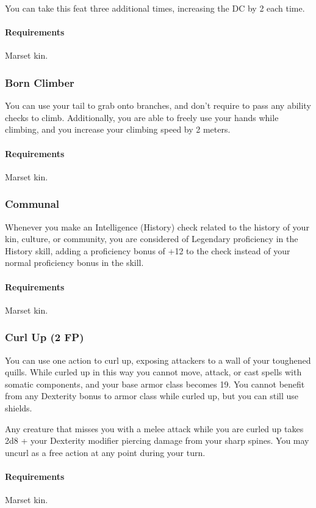         You can take this feat three additional times, increasing the DC by 2 each time.
        \paragraph{Requirements} Marset kin.
    \subsubsection{Born Climber} \label{feat::bornclimber}
        You can use your tail to grab onto branches, and don't require to pass any ability checks to climb.
        Additionally, you are able to freely use your hands while climbing, and you increase your climbing speed by 2 meters.
        \paragraph{Requirements} Marset kin.
    \subsubsection{Communal} \label{feat::communal}
        Whenever you make an Intelligence (History) check related to the history of your kin, culture, or community, you are considered of Legendary proficiency in the History skill, adding a proficiency bonus of +12 to the check instead of your normal proficiency bonus in the skill.
        \paragraph{Requirements} Marset kin.
    \subsubsection{Curl Up (2 FP)} \label{feat::curlup}
        You can use one action to curl up, exposing attackers to a wall of your toughened quills.
        While curled up in this way you cannot move, attack, or cast spells with somatic components, and your base armor class becomes 19.
        You cannot benefit from any Dexterity bonus to armor class while curled up, but you can still use shields.

        Any creature that misses you with a melee attack while you are curled up takes 2d8 + your Dexterity modifier piercing damage from your sharp spines.
        You may uncurl as a free action at any point during your turn.
        \paragraph{Requirements} Marset kin.
